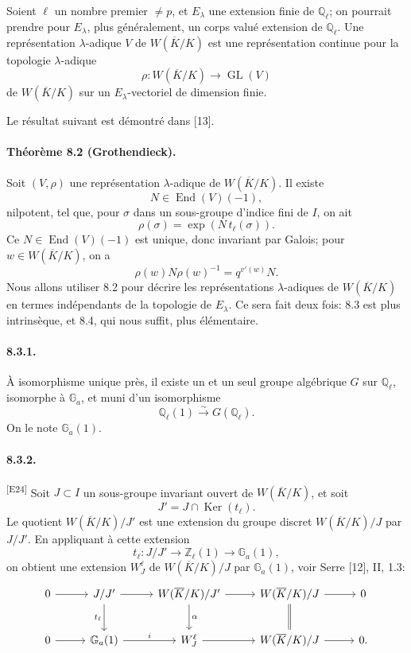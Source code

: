 \documentclass[10pt,letterpaper]{article}
\newcommand{\GL}{\operatorname{GL}}
\newcommand{\iso}{\xrightarrow{\sim}}
\providecommand{\Ker}{\operatorname{Ker}}
\providecommand{\GL}{\operatorname{GL}}
\providecommand{\End}{\operatorname{End}}
\providecommand{\GL}{\operatorname{GL}}
\providecommand{\End}{\operatorname{End}}
\providecommand{\Ker}{\operatorname{Ker}}
\newcommand{\auditmark}[1]{\textsuperscript{\normalfont\scriptsize[E#1]}}
\begin{document}
Soient \(\ell\) un nombre premier \(\ne p\), et \(E_\lambda\) une extension finie de \(\mathbb Q_\ell\); on pourrait prendre pour \(E_\lambda\), plus généralement, un corps valué extension de \(\mathbb Q_\ell\). Une représentation \(\lambda\)-adique \(V\) de \(W(\overline K/K)\) est une représentation continue pour la topologie \(\lambda\)-adique
\[
\rho:W(\overline K/K)\longrightarrow\GL(V)
\]
de \(W(\overline K/K)\) sur un \(E_\lambda\)-vectoriel de dimension finie.

Le résultat suivant est démontré dans [13].

\paragraph{Théorème 8.2 (Grothendieck).} Soit \((V,\rho)\) une représentation \(\lambda\)-adique de \(W(\overline K/K)\). Il existe
\[
N\in\End(V)(-1),
\]
nilpotent, tel que, pour \(\sigma\) dans un sous-groupe d'indice fini de \(I\), on ait
\[
\rho(\sigma)=\exp(N\,t_\ell(\sigma)).
\]
Ce \(N\in\End(V)(-1)\) est unique, donc invariant par Galois; pour \(w\in W(\overline K/K)\), on a
\[
\rho(w)N\rho(w)^{-1}=q^{v'(w)}N.
\]
Nous allons utiliser 8.2 pour décrire les représentations \(\lambda\)-adiques de \(W(\overline K/K)\) en termes indépendants de la topologie de \(E_\lambda\). Ce sera fait deux fois: 8.3 est plus intrinsèque, et 8.4, qui nous suffit, plus élémentaire.

\paragraph{8.3.1.} À isomorphisme unique près, il existe un et un seul groupe algébrique \(G\) sur \(\mathbb Q_\ell\), isomorphe à \(\mathbb G_a\), et muni d'un isomorphisme
\[
\mathbb Q_\ell(1)\iso G(\mathbb Q_\ell).
\]
On le note \(\mathbb G_a(1)\).

\paragraph{8.3.2.}\auditmark{24} Soit \(J\subset I\) un sous-groupe invariant ouvert de \(W(\overline K/K)\), et soit
\[
J'=J\cap\Ker(t_\ell).
\]
Le quotient \(W(\overline K/K)/J'\) est une extension du groupe discret \(W(\overline K/K)/J\) par \(J/J'\). En appliquant à cette extension
\[
t_\ell:J/J'\longrightarrow\mathbb Z_\ell(1)\longrightarrow\mathbb G_a(1),
\]
on obtient une extension \(W_J^\ell\) de \(W(\overline K/K)/J\) par \(\mathbb G_a(1)\), voir Serre [12], II, 1.3:
\[
\begin{tikzcd}[column sep=2.7em,row sep=2.3em]
0 \arrow[r] & J/J' \arrow[r] \arrow[d,"t_\ell"'] &
W(\overline K/K)/J' \arrow[r] \arrow[d,"\alpha"] &
W(\overline K/K)/J \arrow[r] \arrow[d,equal] & 0\\
0 \arrow[r] & \mathbb G_a(1) \arrow[r,"i"] &
W_J^\ell \arrow[r] &
W(\overline K/K)/J \arrow[r] & 0 .
\end{tikzcd}
\]
\end{document}
